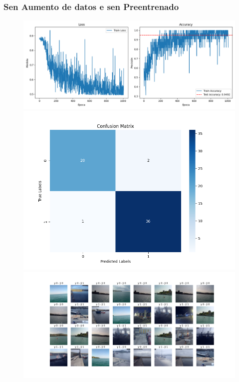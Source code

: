 \documentclass{article}
\begin{document}
\subsubsection{Sen Aumento de datos e sen Preentrenado}
\begin{figure}[H]
    \centering
    \begin{minipage}{0.55\textwidth}
        \centering
        \includegraphics[width=\linewidth]{../ultimas_figuras/LOSS__A_False_P_False_D_False_MLP_True_efficientnet_b4.png}
    \end{minipage}
    \begin{minipage}{0.3\textwidth}
        \centering
        \includegraphics[width=\linewidth]{../ultimas_figuras/CM__A_False_P_False_D_False_MLP_True_efficientnet_b4.png}
    \end{minipage}
    \begin{minipage}{0.7\textwidth}
        \centering
        \includegraphics[width=\linewidth]{../ultimas_figuras/GRID__A_False_P_False_D_False_MLP_True_efficientnet_b4.png}
    \end{minipage}
\end{figure}
\end{document}
